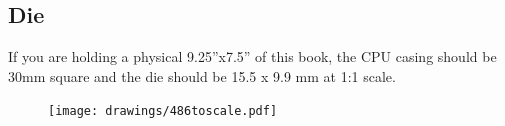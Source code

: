 \subsection{Die}
If you are holding a physical 9.25''x7.5'' of this book, the CPU casing should be 30mm square and the die should be 15.5 x 9.9 mm at 1:1 scale.\\
\par
\bigskip

  \begin{figure}[!htb]

\begin{minipage}{0.48\textwidth}
\centering
{}
\end{minipage}
\hfill
\begin{minipage}{0.48\textwidth}
\centering
\texttt{[image: drawings/486toscale.pdf]}
\end{minipage}
\end{figure}

\par



\begin{figure}[H]
\centering
{}
\end{figure}
\par
\begin{figure}[H]
\centering
{}
\end{figure}






